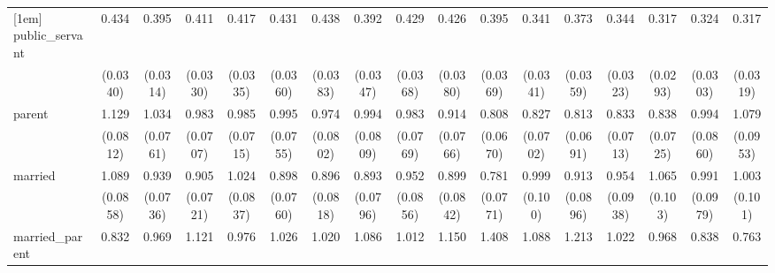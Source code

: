 {\begin{tabular}{l*{16}{c}}
[1em]
public\_servant      &       0.434\sym{***}&       0.395\sym{***}&       0.411\sym{***}&       0.417\sym{***}&       0.431\sym{***}&       0.438\sym{***}&       0.392\sym{***}&       0.429\sym{***}&       0.426\sym{***}&       0.395\sym{***}&       0.341\sym{***}&       0.373\sym{***}&       0.344\sym{***}&       0.317\sym{***}&       0.324\sym{***}&       0.317\sym{***}\\
                    &    (0.0340)         &    (0.0314)         &    (0.0330)         &    (0.0335)         &    (0.0360)         &    (0.0383)         &    (0.0347)         &    (0.0368)         &    (0.0380)         &    (0.0369)         &    (0.0341)         &    (0.0359)         &    (0.0323)         &    (0.0293)         &    (0.0303)         &    (0.0319)         \\
[1em]
parent              &       1.129         &       1.034         &       0.983         &       0.985         &       0.995         &       0.974         &       0.994         &       0.983         &       0.914         &       0.808\sym{*}  &       0.827\sym{*}  &       0.813\sym{*}  &       0.833\sym{*}  &       0.838\sym{*}  &       0.994         &       1.079         \\
                    &    (0.0812)         &    (0.0761)         &    (0.0707)         &    (0.0715)         &    (0.0755)         &    (0.0802)         &    (0.0809)         &    (0.0769)         &    (0.0766)         &    (0.0670)         &    (0.0702)         &    (0.0691)         &    (0.0713)         &    (0.0725)         &    (0.0860)         &    (0.0953)         \\
[1em]
married             &       1.089         &       0.939         &       0.905         &       1.024         &       0.898         &       0.896         &       0.893         &       0.952         &       0.899         &       0.781\sym{*}  &       0.999         &       0.913         &       0.954         &       1.065         &       0.991         &       1.003         \\
                    &    (0.0858)         &    (0.0736)         &    (0.0721)         &    (0.0837)         &    (0.0760)         &    (0.0818)         &    (0.0796)         &    (0.0856)         &    (0.0842)         &    (0.0771)         &     (0.100)         &    (0.0896)         &    (0.0938)         &     (0.103)         &    (0.0979)         &     (0.101)         \\
[1em]
married\_parent      &       0.832         &       0.969         &       1.121         &       0.976         &       1.026         &       1.020         &       1.086         &       1.012         &       1.150         &       1.408\sym{**} &       1.088         &       1.213         &       1.022         &       0.968         &       0.838         &       0.763\sym{*}  \\

\end{tabular}}
